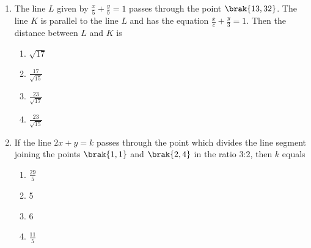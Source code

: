 \begin{enumerate}[label=\thesubsection.\arabic*.,ref=\thesubsection.\theenumi]
\item The line $L$ given by $\frac{x}{5}+\frac{y}{b}=1$ passes through the point $\brak{13, 32}$. The line $K$ is parallel to the line $L$ and has the equation $\frac{x}{c}+\frac{y}{3}=1$. Then the distance between $L$ and $K$ is

\hfill {}
\begin{multicols}{4}
\begin{enumerate}
\item $\sqrt{17}$
\item $\frac{17}{\sqrt{15}}$
\item $\frac{23}{\sqrt{17}}$
\item $\frac{23}{\sqrt{15}}$
\end{enumerate}
\end{multicols} 
%
\item If the line $2x+y=k$ passes through the point which divides the line segment joining the points $\brak{1, 1}$ and $\brak{2, 4}$ in the ratio 3:2, then $k$ equals \hfill {}
\begin{multicols}{4}
\begin{enumerate}
\item $\frac{29}{5}$
\item 5
\item 6
\item $\frac{11}{5}$
\end{enumerate}
\end{multicols} 


\end{enumerate}
